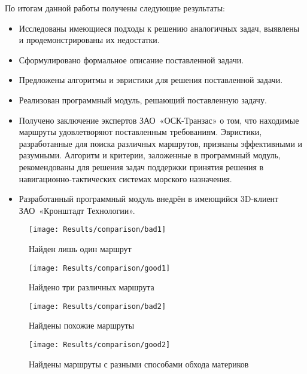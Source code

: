 По итогам данной работы получены следующие результаты:
\begin{itemize}
    \item Исследованы имеющиеся подходы к решению аналогичных задач,
      выявлены и продемонстрированы их недостатки.
    \item Сформулировано формальное описание поставленной задачи.
    \item Предложены алгоритмы и эвристики для решения поставленной
      задачи.
    \item Реализован программный модуль, решающий поставленную задачу.
    \item Получено заключение экспертов ЗАО~«ОСК-Транзас» о том, что
      находимые маршруты удовлетворяют поставленным требованиям.
      Эвристики, разработанные для поиска различных маршрутов,
      признаны эффективными и разумными. Алгоритм и критерии,
      заложенные в программный модуль, рекомендованы для решения задач
      поддержки принятия решения в навигационно-тактических системах
      морского назначения.
    \item Разработанный программный модуль внедрён в имеющийся
      3D-клиент ЗАО~«Кронштадт Технологии».
\end{itemize}

\begin{figure}
    \texttt{[image: Results/comparison/bad1]}
    \caption{Найден лишь один маршрут}
    \label{fig:res-comp-bad1}
\end{figure}

\begin{figure}
    \texttt{[image: Results/comparison/good1]}
    \caption{Найдено три различных маршрута}
    \label{fig:res-comp-good1}
\end{figure}

\begin{figure}
    \texttt{[image: Results/comparison/bad2]}
    \caption{Найдены похожие маршруты}
    \label{fig:res-comp-bad2}
\end{figure}

\begin{figure}
    \texttt{[image: Results/comparison/good2]}
    \caption{Найдены маршруты с разными способами обхода материков}
    \label{fig:res-comp-good2}
\end{figure}

